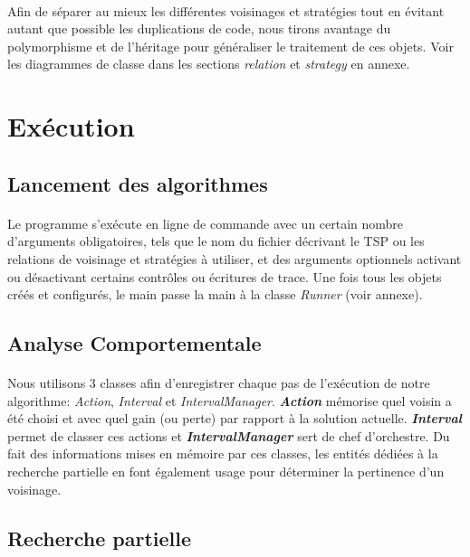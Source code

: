 \documentclass[a4paper,10pt]{report}
\begin{document}
\paragraph{}
  Afin de séparer au mieux les différentes voisinages et stratégies tout en
évitant autant que possible les duplications de code, nous tirons avantage du
polymorphisme et de l'héritage pour généraliser le traitement de ces objets.
Voir les diagrammes de classe dans les sections \textit{relation} et
\textit{strategy} en annexe.


\section{Exécution}
\subsection{Lancement des algorithmes}
\paragraph{}
  Le programme s'exécute en ligne de commande avec un certain nombre d'arguments
obligatoires, tels que le nom du fichier décrivant le TSP ou les relations de
voisinage et stratégies à utiliser, et des arguments optionnels activant ou
désactivant certains contrôles ou écritures de trace. Une fois tous les objets
créés et configurés, le main passe la main à la classe \textit{Runner} (voir
annexe).

\subsection{Analyse Comportementale}
\paragraph{}
  Nous utilisons 3 classes afin d'enregistrer chaque pas de l'exécution de notre
algorithme: \textit{Action}, \textit{Interval} et \textit{IntervalManager}.
\textbf{\textit{Action}} mémorise quel voisin a été choisi et avec quel gain (ou
perte) par rapport à la solution actuelle. \textbf{\textit{Interval}} permet de
classer ces actions et \textbf{\textit{IntervalManager}} sert de chef
d'orchestre. Du fait des informations mises en mémoire par ces classes, les
entités dédiées à la recherche partielle en font également usage pour déterminer
la pertinence d'un voisinage.

\subsection{Recherche partielle}
\end{document}
